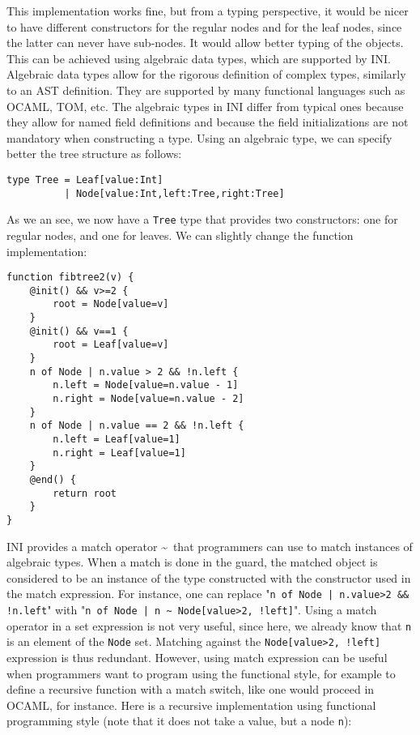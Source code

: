 \documentclass[11pt]{article}
\begin{document}
This implementation works fine, but from a typing perspective, it would be nicer to have different constructors for the regular nodes and for the leaf nodes, since the latter can never have sub-nodes. It would allow better typing of the objects. This can be achieved using algebraic data types, which are supported by INI. Algebraic data types allow for the rigorous definition of complex types, similarly to an AST definition. They are supported by many functional languages such as OCAML, TOM, etc. The algebraic types in INI differ from typical ones because they allow for named field definitions and because the field initializations are not mandatory when constructing a type. Using an algebraic type, we can specify better the tree structure as follows:

\begin{lstlisting}[numbers=none]
type Tree = Leaf[value:Int]
          | Node[value:Int,left:Tree,right:Tree]
\end{lstlisting}

As we an see, we now have a \texttt{Tree} type that provides two constructors: one for regular nodes, and one for leaves. We can slightly change the function implementation:

\begin{lstlisting}
function fibtree2(v) {
	@init() && v>=2 {
		root = Node[value=v]
	}
	@init() && v==1 {
		root = Leaf[value=v]
	}
	n of Node | n.value > 2 && !n.left {
		n.left = Node[value=n.value - 1]
		n.right = Node[value=n.value - 2]
	}
	n of Node | n.value == 2 && !n.left {
		n.left = Leaf[value=1]
		n.right = Leaf[value=1]
	}
	@end() {
		return root
	}
}
\end{lstlisting}

INI provides a match operator \~~that programmers can use to match instances of algebraic types. When a match is done in the guard, the matched object is considered to be an instance of the type constructed with the constructor used in the match expression. For instance, one can replace "\texttt{n of Node | n.value>2 \&\& !n.left}" with "\texttt{n of Node | n \~~Node[value>2, !left]}". Using a match operator in a set expression is not very useful, since here, we already know that \texttt{n} is an element of the \texttt{Node} set. Matching against the \texttt{Node[value>2, !left]} expression is thus redundant. However, using match expression can be useful when programmers want to program using the functional style, for example to define a recursive function with a match switch, like one would proceed in OCAML, for instance. Here is a recursive implementation using functional programming style (note that it does not take a value, but a node \texttt{n}):
\end{document}
